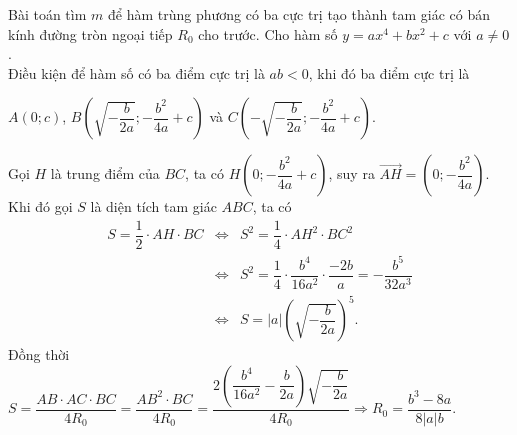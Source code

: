 \begin{dang}{Bài toán tìm $m$ để hàm trùng phương có ba cực trị tạo thành tam giác có bán kính đường tròn ngoại tiếp $R_0$ cho trước.}
	Cho hàm số $y=ax^4+bx^2+c$ với $a \neq 0$.\\
	Điều kiện để hàm số có ba điểm cực trị là $ab < 0$, khi đó ba điểm cực trị là 
	\begin{center}
		$A(0;c)$, $B\left(\sqrt{-\dfrac{b}{2a}};-\dfrac{b^2}{4a}+c\right)$ và $C\left(-\sqrt{-\dfrac{b}{2a}};-\dfrac{b^2}{4a}+c\right)$.
	\end{center}
	Gọi $H$ là trung điểm của $BC$, ta có $H\left(0;-\dfrac{b^2}{4a}+c\right)$, suy ra $\overrightarrow{AH}=\left(0;-\dfrac{b^2}{4a}\right)$.\\
	Khi đó gọi $S$ là diện tích tam giác $ABC$, ta có 
	\begin{eqnarray*}
		S=\dfrac{1}{2}\cdot AH\cdot BC&\Leftrightarrow& S^2=\dfrac{1}{4}\cdot AH^2\cdot BC^2\\
		&\Leftrightarrow&S^2=\dfrac{1}{4}\cdot\dfrac{b^4}{16a^2}\cdot\dfrac{-2b}{a}=-\dfrac{b^5}{32a^3}\\
		&\Leftrightarrow&S = \left|a\right|\left(\sqrt{- \dfrac{b}{2a}}\right)^5.
	\end{eqnarray*}
	Đồng thời $S = \dfrac{AB\cdot AC\cdot BC}{4R_0} = \dfrac{AB^2\cdot BC}{4R_0} = \dfrac{2\left(\dfrac{b^4}{16a^2} - \dfrac{b}{2a}\right)\sqrt{- \dfrac{b}{2a}}}{4R_0} \Rightarrow \boxed{R_{0} = \dfrac{b^3 - 8a}{8\left|a\right|b}}.$
\end{dang}
